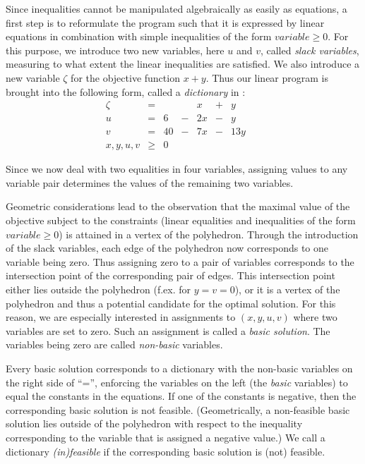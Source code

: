 \documentclass[ukenglish,a4]{article}
\begin{document}
Since inequalities cannot be manipulated algebraically as easily
as equations, a first step is to reformulate the program such that it is expressed
by linear equations in combination with simple inequalities of the form
$\mathit{variable}\geq 0$. For this purpose, we introduce
two new variables, here $u$ and $v$, called \emph{slack variables}, 
measuring to what extent the linear inequalities are satisfied. 
We also introduce a new variable $\zeta$
for the objective function $x+y$. 
Thus our linear program is brought into the following form, 
called a \emph{dictionary} in \cite{Vanderbei}:
\[    
    \begin{array}{lcrcrcrcr}
      \zeta&=&   & &     x &+&     y & &  \\\hline
      u    &=& 6 &-&   2 x &-&     y & &  \\
      v    &=& 40&-&   7 x &-&  13 y & &  \\
      x,y,u,v  &\geq&0     & &  & &  & &    
    \end{array}
\]

Since we now deal with two equalities in four variables, 
assigning values to any variable pair determines the values of the remaining two variables.

Geometric considerations lead to the observation that the
maximal value of the objective subject to the constraints (linear
equalities and inequalities of the form 
$\mathit{variable}\geq 0$) is attained in a vertex of the polyhedron. 
Through the introduction of the slack variables, each edge of the polyhedron now corresponds to one variable
being zero. Thus assigning zero to a pair of variables corresponds to the intersection point of the corresponding pair of edges. 
This intersection point either lies outside the polyhedron (f.ex. for $y=v=0$), or  
it is a vertex of the polyhedron and thus a potential candidate for the optimal solution. 
For this reason, we are especially interested in assignments to $(x,y,u,v)$ where two variables are set to zero. 
Such an assignment is called a \emph{basic solution}. The variables being zero are called \emph{non-basic} variables.

Every basic solution corresponds to a dictionary with the non-basic variables on the right side of ``='', 
enforcing the variables on the left (the \emph{basic} variables) to equal the constants in the equations. 
If one of the constants is negative, then the corresponding basic solution is not feasible. 
(Geometrically, a non-feasible basic solution lies outside of the polyhedron with respect to 
the inequality corresponding to the variable that is assigned a negative value.)
We  call a dictionary \emph{(in)feasible} if the corresponding basic solution is (not) feasible.
\end{document}

